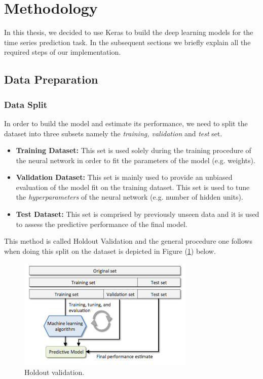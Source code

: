 \documentclass[a4paper, 12pt]{article}
\numberwithin{equation}{section}
\numberwithin{figure}{section}
\numberwithin{table}{section}
\begin{document}
	\newpage
	
	\section{Methodology}
	
	In this thesis, we decided to use Keras to build the deep learning models for the time series prediction task. In the subsequent sections we briefly explain all the required steps of our implementation.
	
	\subsection{Data Preparation}
	
	\subsubsection{Data Split}
	
	In order to build the model and estimate its performance, we need to split the dataset into three subsets namely the \textit{training, validation} and \textit{test} set.
	
	\begin{itemize}
		\item \textbf{Training Dataset:}
		This set is used solely during the training procedure of the neural network in order to fit the parameters of the model (e.g. weights).
		
		\item \textbf{Validation Dataset:}
		This set is mainly used to provide an unbiased evaluation of the model fit on the training dataset. This set is used to tune the \textit{hyperparameters} of the neural network (e.g. number of hidden units).
		
		\item \textbf{Test Dataset:}
		This set is comprised by previously unseen data and it is used to assess the predictive performance of the final model.
	\end{itemize}

	\vspace*{0.5cm}
	
	This method is called Holdout Validation and the general procedure one follows when doing this split on the dataset is depicted in Figure (\ref{fig:train_valid_test}) below.
	
	\begin{figure}[H]
		\centering
		\includegraphics[width=0.75\textwidth, height=0.75\textheight, keepaspectratio]{train_valid_test.png}
		\caption{Holdout validation.}
		\label{fig:train_valid_test}
	\end{figure}
	
\end{document}

